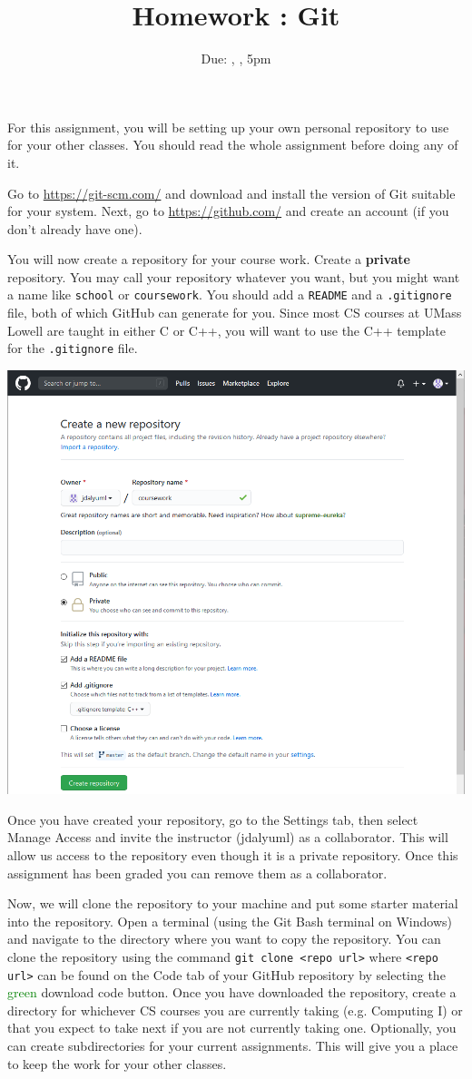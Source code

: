 \documentclass[12pt]{article}
\title{Homework \hwno: Git}
\date{Due: \dayofweekname{\duedate}{\duemonth}{\year}, \monthname[\duemonth] \duedate, 5pm}
\newcommand{\code}[1]{\texttt{#1}}
\begin{document}
\maketitle

For this assignment, you will be setting up your own personal repository to use for your other classes.  You should read the whole assignment before doing any of it.

Go to \url{https://git-scm.com/} and download and install the version of Git suitable for your system.
Next, go to \url{https://github.com/} and create an account (if you don't already have one).

You will now create a repository for your course work.
Create a \textbf{private} repository.
You may call your repository whatever you want, but you might want a name like \code{school} or \code{coursework}.
You should add a \code{README} and a \code{.gitignore} file, both of which GitHub can generate for you.
Since most CS courses at UMass Lowell are taught in either C or C++, you will want to use the C++ template for the \code{.gitignore} file.

\includegraphics[width=0.7\columnwidth]{newrepo}

Once you have created your repository, go to the Settings tab, then select Manage Access and invite the instructor (jdalyuml) as a collaborator.
This will allow us access to the repository even though it is a private repository.
Once this assignment has been graded you can remove them as a collaborator.

Now, we will clone the repository to your machine and put some starter material into the repository.
Open a terminal (using the Git Bash terminal on Windows) and navigate to the directory where you want to copy the repository.
You can clone the repository using the command \code{git clone <repo url>} where \code{<repo url>} can be found on the Code tab of your GitHub repository by selecting the \textcolor{green}{green} download code button.
Once you have downloaded the repository, create a directory for whichever CS courses you are currently taking (e.g. Computing I) or that you expect to take next if you are not currently taking one.
Optionally, you can create subdirectories for your current assignments.
This will give you a place to keep the work for your other classes.
\end{document}
